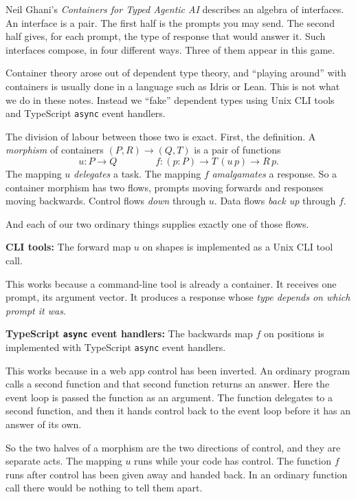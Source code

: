 \documentclass[11pt,a4paper]{article}
\begin{document}
\begin{sectionbox}
Neil Ghani's \emph{Containers for Typed Agentic AI} describes an algebra of interfaces. An
interface is a pair. The first half is the prompts you may send. The second half gives, for each
prompt, the type of response that would answer it. Such interfaces compose, in four different ways.
Three of them appear in this game.

Container theory arose out of dependent type theory, and ``playing around'' with containers is
usually done in a language such as Idris or Lean. This is not what we do in these notes. Instead we
``fake'' dependent types using Unix CLI tools and TypeScript \texttt{async} event handlers.

The division of labour between those two is exact. First, the definition. A \emph{morphism} of containers $(P,R) \to (Q,T)$ is a pair of functions
\[
  u : P \to Q
  \qquad\qquad
  f : (p : P) \to T\,(u\,p) \to R\,p .
\]
The mapping $u$ \emph{delegates} a task. The mapping $f$ \emph{amalgamates} a response. So a
container morphism has two flows, prompts moving forwards and responses moving backwards. Control
flows \emph{down} through $u$. Data flows \emph{back up} through $f$.

And each of our two ordinary things supplies exactly one of those flows.

\textbf{CLI tools:} The forward map $u$ on shapes is implemented as a Unix CLI tool call.

This works because a command-line tool is already a container. It receives one prompt, its
argument vector. It produces a response whose \emph{type depends on which prompt it was}.

\textbf{TypeScript \texttt{async} event handlers:} The backwards map $f$ on positions is
implemented with TypeScript \texttt{async} event handlers.

This works because in a web app control has been inverted. An ordinary program calls a second
function and that second function returns an answer. Here the event loop is passed the function as
an argument. The function delegates to a second function, and then it hands control back to the
event loop before it has an answer of its own.

So the two halves of a morphism are the two directions of control, and they are separate acts. The
mapping $u$ runs while your code has control. The function $f$ runs after control has been given
away and handed back. In an ordinary function call there would be nothing to tell them apart.
\end{sectionbox}
\end{document}
